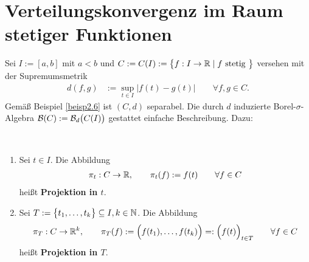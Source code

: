 \section{Verteilungskonvergenz im Raum stetiger Funktionen} %
Sei $I:=[a,b]$ mit $a<b$ und $C:=C(I):=\big\lbrace f:I\to\mathbb{R}\mid f\text{ stetig }\big\rbrace$ versehen mit der Supremumsmetrik
\begin{align*}
d(f,g)&:=\sup\limits_{t\in I}\big|f(t)-g(t)\big|\qquad\forall f,g\in C.
\end{align*}
Gemäß Beispiel \ref{beisp2.6} ist $(C,d)$ separabel. Die durch $d$ induzierte Borel-$\sigma$-Algebra
$\mathcal{B}(C):=\mathcal{B}_d\big(C(I)\big)$
gestattet einfache Beschreibung. Dazu:

\begin{definition}\ %
\begin{enumerate}[label=(\arabic*)]
\item Sei $t\in I$. Die Abbildung 
\begin{align*}
\pi_t:C\to\mathbb{R},\qquad\pi_t(f):=f(t)\qquad\forall f\in C
\end{align*}
heißt \textbf{Projektion in $t$}.
\item Sei $T:=\big\lbrace t_1,\ldots,t_k\big\rbrace\subseteq I,k\in\mathbb{N}$. Die Abbildung
\begin{align*}
\pi_T:C\to\mathbb{R}^k,\qquad \pi_T(f):=\Big(f(t_1),\ldots,f(t_k)\Big)=:
\Big(f(t)\Big)_{t\in T}\qquad\forall f\in C
\end{align*}
heißt \textbf{Projektion in $T$}.
\end{enumerate}
\end{definition}


